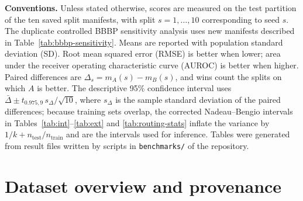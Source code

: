 \documentclass[10pt,a4paper]{article}
\begin{document}
\textbf{Conventions.} Unless stated otherwise, scores are measured on the test partition of the ten saved split manifests, with split $s=1,\dots,10$ corresponding to seed $s$. The duplicate controlled BBBP sensitivity analysis uses new manifests described in Table~\ref{tab:bbbp-sensitivity}. Means are reported with population standard deviation (SD). Root mean squared error (RMSE) is better when lower; area under the receiver operating characteristic curve (AUROC) is better when higher. Paired differences are $\Delta_s=m_A(s)-m_B(s)$, and wins count the splits on which $A$ is better. The descriptive 95\% confidence interval uses $\bar\Delta\pm t_{0.975,9}\,s_\Delta/\sqrt{10}$, where $s_\Delta$ is the sample standard deviation of the paired differences; because training sets overlap, the corrected Nadeau--Bengio intervals in Tables~\ref{tab:int}--\ref{tab:ext} and \ref{tab:routing-stats} inflate the variance by $1/k+n_{\mathrm{test}}/n_{\mathrm{train}}$ and are the intervals used for inference. Tables were generated from result files written by scripts in \texttt{benchmarks/} of the repository.

\section*{Dataset overview and provenance}
\end{document}
